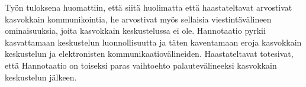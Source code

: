 \documentclass[english,12pt,a4paper,pdftex]{article}
\begin{document}
\begin{abstractpage}[finnish]

Työn tuloksena huomattiin, että siitä huolimatta että haastateltavat arvostivat kasvokkain kommunikointia, he arvostivat myös sellaisia viestintävälineen ominaisuuksia, joita kasvokkain keskustelussa ei ole. Hannotaatio pyrkii kasvattamaan keskustelun luonnollisuutta ja täten kaventamaan eroja kasvokkain keskustelun ja elektronisten kommunikaatiovälineiden. Haastateltavat totesivat, että Hannotaatio on toiseksi paras vaihtoehto palautevälineeksi kasvokkain keskustelun jälkeen.

\end{abstractpage}
\end{document}
